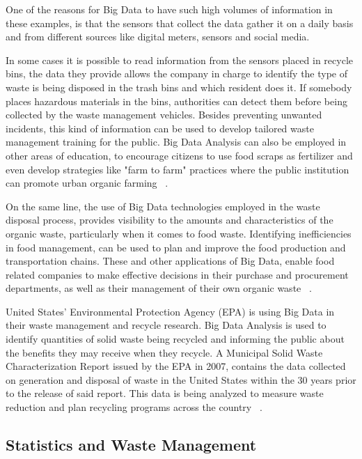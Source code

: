\documentclass[sigconf]{acmart}
\begin{document}
One of the reasons for Big Data to have such high volumes of information in these examples, is that the sensors that collect the data gather it on a daily basis and from different sources like digital meters, sensors and social media. 

In some cases it is possible to read information from the sensors placed in recycle bins, the data they provide allows the company in charge to identify the type of waste is being disposed in the trash bins and which resident does it. If somebody places hazardous materials in the bins, authorities can detect them before  being collected by the waste management vehicles. Besides preventing unwanted incidents, this kind of information can be used to develop tailored waste management training for the public. Big Data Analysis can also be employed in other areas of education, to encourage citizens to use food scraps as fertilizer and even develop strategies like "farm to farm" practices where the public institution can promote urban organic farming ~\cite{james2012}.

On the same line, the use of Big Data technologies employed in the  waste disposal process, provides visibility to the amounts and characteristics of the organic waste, particularly when it comes to food waste. Identifying inefficiencies in food management, can be used to plan and improve the food production and transportation chains. These and other applications of Big Data, enable food related companies to make effective decisions in their purchase and procurement departments, as well as their management of their own organic waste ~\cite{frank2016}.

United States' Environmental Protection Agency (EPA) is using Big Data in their waste management and recycle research. Big Data Analysis is used to identify quantities of solid waste being recycled and informing the public about the benefits they may receive when they recycle. A Municipal Solid Waste Characterization Report issued by the EPA in 2007, contains the data collected on generation and disposal of waste in the United States within the 30 years prior to the release of said report. This data is being analyzed to measure waste reduction and plan recycling programs across the country ~\cite{epaRecycleBenefits2007}.

\subsection{Statistics and Waste Management}
\end{document}
